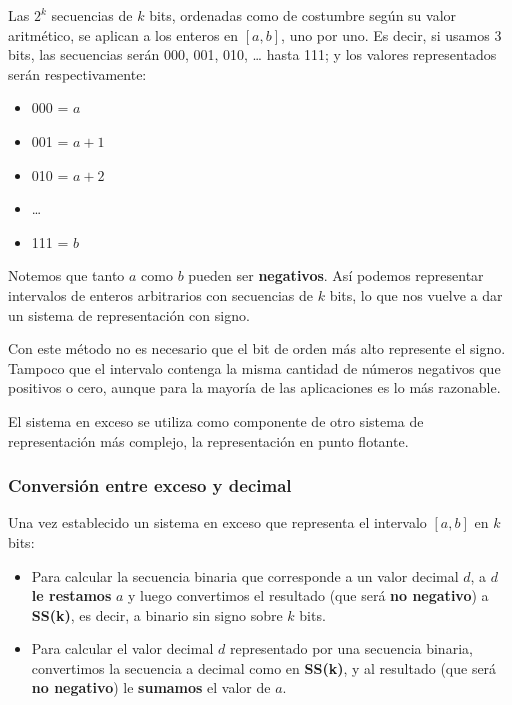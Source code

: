 \documentclass[spanish,A4,]{article}
\begin{document}
Las $2^k$ secuencias de $k$ bits, ordenadas como de costumbre según su
valor aritmético, se aplican a los enteros en $[a, b]$, uno por uno. Es
decir, si usamos 3 bits, las secuencias serán 000, 001, 010, \ldots{}
hasta 111; y los valores representados serán respectivamente:

\begin{itemize}
\itemsep1pt\parskip0pt
\item
  000 = $a$
\item
  001 = $a + 1$
\item
  010 = $a + 2$
\item
  \ldots{}
\item
  111 = $b$
\end{itemize}

Notemos que tanto $a$ como $b$ pueden ser \textbf{negativos}. Así
podemos representar intervalos de enteros arbitrarios con secuencias de
$k$ bits, lo que nos vuelve a dar un sistema de representación con
signo.

Con este método no es necesario que el bit de orden más alto represente
el signo. Tampoco que el intervalo contenga la misma cantidad de números
negativos que positivos o cero, aunque para la mayoría de las
aplicaciones es lo más razonable.

El sistema en exceso se utiliza como componente de otro sistema de
representación más complejo, la representación en punto flotante.

\subsubsection{Conversión entre exceso y
decimal}\label{conversiuxf3n-entre-exceso-y-decimal}

Una vez establecido un sistema en exceso que representa el intervalo
$[a, b]$ en $k$ bits:

\begin{itemize}
\itemsep1pt\parskip0pt
\item
  Para calcular la secuencia binaria que corresponde a un valor decimal
  $d$, a $d$ \textbf{le restamos} $a$ y luego convertimos el resultado
  (que será \textbf{no negativo}) a \textbf{SS(k)}, es decir, a binario
  sin signo sobre $k$ bits.
\item
  Para calcular el valor decimal $d$ representado por una secuencia
  binaria, convertimos la secuencia a decimal como en \textbf{SS(k)}, y
  al resultado (que será \textbf{no negativo}) le \textbf{sumamos} el
  valor de $a$.
\end{itemize}
\end{document}
